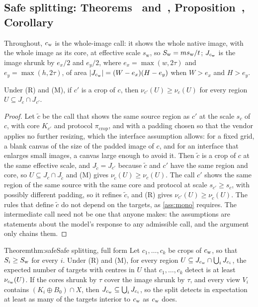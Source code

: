\subsection{Safe splitting: Theorems~ and~, Proposition~, Corollary~}
\label{sec:proofs-safe}

Throughout, $c_{\mathrm{w}}$ is the whole-image call: it shows the whole native image, with the whole image as its core, at effective scale $s_{\mathrm{w}}$, so $S_{\mathrm{w}} = ms_{\mathrm{w}}/t$; $J_{c_{\mathrm{w}}}$ is the image shrunk by $e_x/2$ and $e_y/2$, where $e_x = \max(w, 2\tau)$ and $e_y = \max(h, 2\tau)$, of area $|J_{c_{\mathrm{w}}}| = (W - e_x)(H - e_y)$ when $W > e_x$ and $H > e_y$.

\begin{lemma}
\label{lem:crop}
Under (R) and (M), if $c'$ is a crop of $c$, then $\nu_{c'}(U) \ge \nu_c(U)$ for every region $U \subseteq J_c \cap J_{c'}$.
\end{lemma}

\begin{proof}
Let $\tilde c$ be the call that shows the same source region as $c'$ at the scale $s_c$ of $c$, with core $K_{c'}$ and protocol $\pi_{\mathrm{crop}}$, and with a padding chosen so that the vendor applies no further resizing, which the interface assumption allows: for a fixed grid, a blank canvas of the size of the padded image of $c$, and for an interface that enlarges small images, a canvas large enough to avoid it. Then $\tilde c$ is a crop of $c$ at the same effective scale, and $J_{\tilde c} = J_{c'}$ because $\tilde c$ and $c'$ have the same region and core, so $U \subseteq J_c \cap J_{\tilde c}$ and (M) gives $\nu_{\tilde c}(U) \ge \nu_c(U)$. The call $c'$ shows the same region of the same source with the same core and protocol at scale $s_{c'} \ge s_c$, with possibly different padding, so it refines $\tilde c$, and (R) gives $\nu_{c'}(U) \ge \nu_{\tilde c}(U)$. The rules that define $\tilde c$ do not depend on the targets, as \cref{ass:mono} requires. The intermediate call need not be one that anyone makes: the assumptions are statements about the model's response to any admissible call, and the argument only chains them.
\end{proof}

\begin{restate}{Theorem}{thm:safe}{Safe splitting, full form}
Let $c_1, \dots, c_k$ be crops of $c_{\mathrm{w}}$, so that $S_i \ge S_{\mathrm{w}}$ for every $i$. Under (R) and (M), for every region $U \subseteq J_{c_{\mathrm{w}}} \cap \bigcup_i J_{c_i}$, the expected number of targets with centres in $U$ that $c_1, \dots, c_k$ detect is at least $\nu_{c_{\mathrm{w}}}(U)$. If the cores shrunk by $\tau$ cover the image shrunk by $\tau$, and every view $V_i$ contains $(K_i \oplus B_0) \cap X$, then $J_{c_{\mathrm{w}}} \subseteq \bigcup_i J_{c_i}$, so the split detects in expectation at least as many of the targets interior to $c_{\mathrm{w}}$ as $c_{\mathrm{w}}$ does.
\end{restate}

